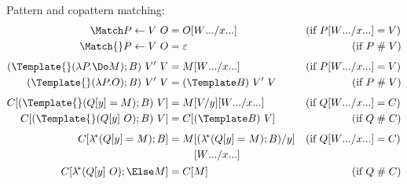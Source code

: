 \begin{figure}[t!]

Pattern and copattern matching:
\begin{align*}
  \Match P \gets V ~ O
  &=
  O\subst{\many{x}}{\many{W}}
  &(\text{if } P\subst{\many{x}}{\many{W}} &= V)
  \\
  \Match{} P \gets V ~ O
  &=
  \varepsilon
  &(\text{if } P &\apart V)
  \\[1ex]
  (\Template{} (\lambda P. \Do M); B) ~ V' ~ V
  &=
  M\subst{\many{x}}{\many{W}}
  &(\text{if } P\subst{\many{x}}{\many{W}} &= V)
  \\
  (\Template{} (\lambda P. O); B) ~ V' ~ V
  &=
  (\Template B) ~ V' ~ V
  &(\text{if } P &\apart V)
  \\[1ex]
  C[(\Template{} (Q[y] = M); B) ~ V]
  &=
  M\subst{y}{V}\subst{\many{x}}{\many{W}}
  &(\text{if } Q\subst{\many{x}}{\many{W}} &= C)
  \\
  C[(\Template{} (Q[y] ~ O); B) ~ V]
  &=
  C[(\Template B) ~ V]
  &(\text{if } Q &\apart C)
  \\[1ex]
  C[\lamstar (Q[y] = M); B]
  &=
  \begin{aligned}[t]
    M
    &\subst{y}{(\lamstar (Q[y] = M); B)}
    \\
    &\subst{\many{x}}{\many{W}}
  \end{aligned}
  &(\text{if } Q\subst{\many{x}}{\many{W}} &= C)
  \\
  C[\lamstar (Q[y] ~ O); \Else M]
  &=
  C[M]
  &(\text{if } Q &\apart C)
\end{align*}


\end{figure}
